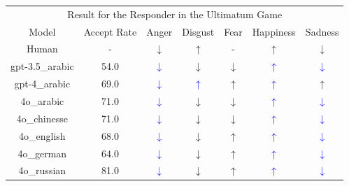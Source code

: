 \documentclass{article}
\newcommand{\bluearrow}[1]{\textcolor{blue}{#1}}
\begin{document}
\begin{table}
\begin{tabular}{ccccccc}
         \hline
        \multicolumn{7}{c}{Result for the Responder in the Ultimatum Game} \\
         Model & Accept Rate & Anger & Disgust & Fear & Happiness & Sadness \\

Human        & -  & $\downarrow$ & $\uparrow$ & -  & $\uparrow$ & $\downarrow$ \\
gpt-3.5\_arabic & 54.0 & \bluearrow{$\downarrow$} & $\downarrow$ & $\downarrow$ & \bluearrow{$\uparrow$} & \bluearrow{$\downarrow $}\\
gpt-4\_arabic & 69.0 & \bluearrow{$\downarrow$} & \bluearrow{$\uparrow$} & $\uparrow$ & \bluearrow{$\uparrow$} & $\uparrow $\\
4o\_arabic & 71.0 & \bluearrow{$\downarrow$} & $\downarrow$ & $\downarrow$ & \bluearrow{$\uparrow$} & \bluearrow{$\downarrow $}\\
4o\_chinesse & 71.0 & \bluearrow{$\downarrow$} & $\downarrow$ & $\downarrow$ & \bluearrow{$\uparrow$} & \bluearrow{$\downarrow $}\\
4o\_english & 68.0 & \bluearrow{$\downarrow$} & $\downarrow$ & $\uparrow$ & \bluearrow{$\uparrow$} & \bluearrow{$\downarrow $}\\
4o\_german & 64.0 & \bluearrow{$\downarrow$} & $\downarrow$ & $\uparrow$ & \bluearrow{$\uparrow$} & \bluearrow{$\downarrow $}\\
4o\_russian & 81.0 & \bluearrow{$\downarrow$} & $\downarrow$ & $\uparrow$ & \bluearrow{$\uparrow$} & \bluearrow{$\downarrow $}\\

\end{tabular}
\end{table}
\end{document}
